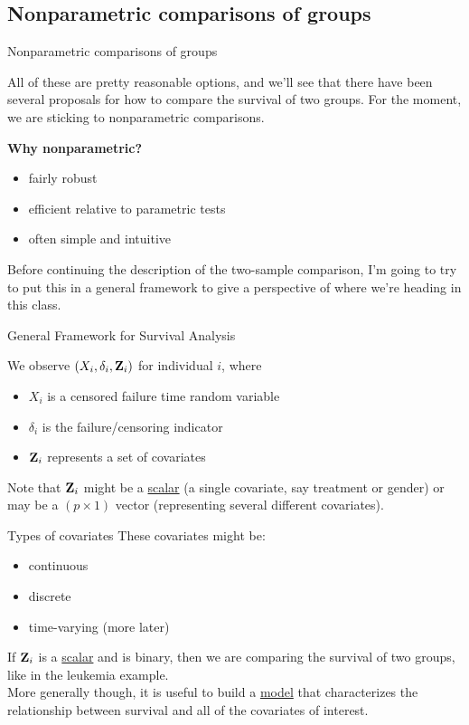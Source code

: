 \documentclass[envcountsect, 10pt, portrait, palatino]{beamer}
\begin{document}
\subsection{Nonparametric comparisons of groups}
\begin{frame}{Nonparametric comparisons of groups}

All of these are pretty reasonable options, and we'll see that
there have been several proposals for how to compare the survival
of two groups.  For the moment, we are sticking to nonparametric
comparisons.
\\[2ex]
{\bf Why nonparametric?
\begin{itemize}
\item fairly robust
\item efficient relative to parametric tests
\item often simple and intuitive
\end{itemize}}
Before continuing the description of the two-sample comparison, I'm
going to try to put this in a general framework to give a perspective
of where we're heading in this class.
\end{frame}
\begin{frame}{General Framework for Survival Analysis}

We observe $(X_i, \delta_i, {\bf Z}_i)$ for individual $i$, where
\begin{itemize}
\item $X_i$ is a censored failure time random variable
\item $\delta_i$ is the failure/censoring indicator
\item ${\bf Z}_i$ represents a set of covariates
\end{itemize}

Note that ${\bf Z}_i$ might be a \underline{scalar} (a single covariate, say
treatment or gender) or may be a $(p\times 1)$ vector (representing
several different covariates).
\end{frame}
\begin{frame}{Types of covariates}
These covariates might be:

\begin{itemize}
\item  continuous
\item  discrete
\item  time-varying (more later)
\end{itemize}

If ${\bf Z}_i$ is a \underline{scalar} and is binary, then we are
comparing the survival of two groups, like in the leukemia example.
\\[2ex]
More generally though, it is useful to build a \underline{model} that
characterizes the relationship between survival and all of the covariates
of interest.
\end{frame}
\end{document}
